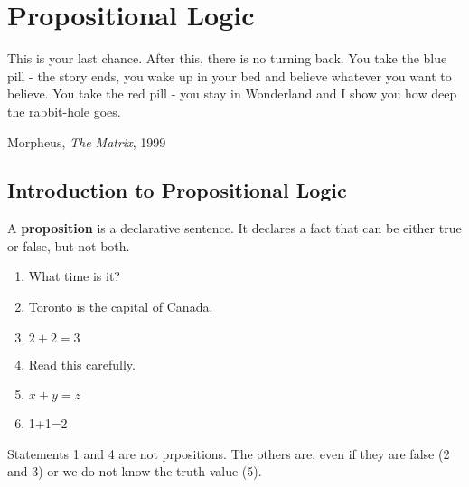 \chapter{Propositional Logic}
\epigraph{This is your last chance. After this, there is no turning back. You
take the blue pill - the story ends, you wake up in your bed and believe
whatever you want to believe. You take the red pill - you stay in Wonderland and
I show you how deep the rabbit-hole goes.}{Morpheus, \emph{The Matrix}, 1999}

\section{Introduction to Propositional Logic}

\begin{defn}
  A \textbf{proposition} is a declarative sentence. It declares a fact that can be either true or false, but not both.
\end{defn}

\begin{ex}
  \begin{enumerate}
    \item What time is it?
    \item Toronto is the capital of Canada.
    \item \(2+2=3\)
    \item Read this carefully.
    \item \(x+y=z\)
    \item 1+1=2
  \end{enumerate}
  Statements 1 and 4 are not prpositions.
  The others are, even if they are false (2 and 3) or we do not know the truth value (5).
\end{ex}

